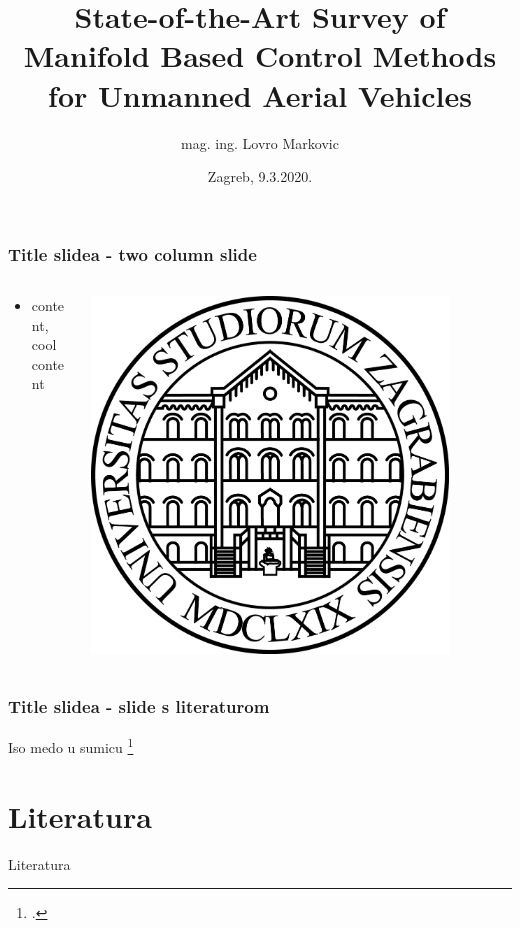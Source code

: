 \documentclass[aspectratio=43,mathserif]{beamer}
\author{mag. ing. Lovro Markovic}
\title[PhD Qualifying Exam]{State-of-the-Art Survey of Manifold Based Control Methods for	Unmanned Aerial Vehicles}
\date{Zagreb, 9.3.2020.}
\begin{document}
\begin{frame}
\titlepage
\end{frame}

\begin{frame}
\frametitle{Title slidea - two column slide}
\begin{columns}
\begin{column}{0.5\textwidth}
  \begin{itemize}
	\item[] content, cool content
	\end{itemize}
\end{column}
\begin{column}{0.5\textwidth}  %
    \begin{center}
     \includegraphics[width=0.85\textwidth]{figures/unizg}
     \end{center}
\end{column}
\end{columns}
\end{frame}

\begin{frame}
\frametitle{Title slidea - slide s literaturom}
Iso medo u sumicu \footcite{clanak}
\end{frame}

\section*{Literatura}
\begin{frame}[allowframebreaks]{Literatura}
\printbibliography
\end{frame}
\end{document}
